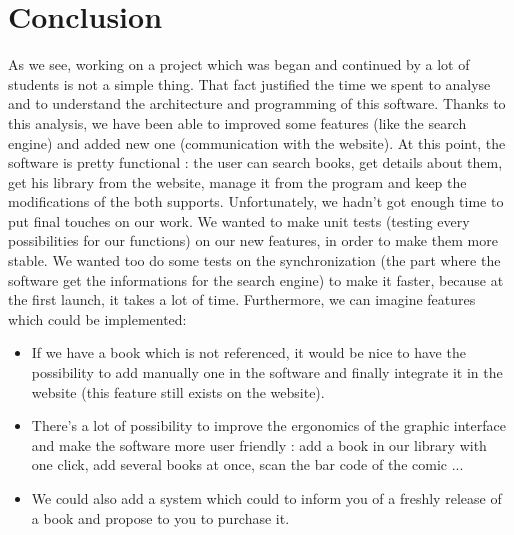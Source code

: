 \documentclass[11pt]{report} %
\begin{document}
\chapter{Conclusion}
As we see, working on a project which was began and continued by a lot of students is not a simple thing. That fact justified the time we spent to analyse and to understand the architecture and programming of this software. Thanks to this analysis, we have been able to improved some features (like the search engine) and added new one (communication with the website). 
\newline At this point, the software is pretty functional : the user can search books, get details about them, get his library from the website, manage it from the program and keep the modifications of the both supports.
\newline Unfortunately, we hadn't got enough time to put final touches on our work. We wanted to make unit tests (testing every possibilities for our functions) on our new features, in order to make them more stable. We wanted too do some tests on the synchronization (the part where the software get the informations for the search engine) to make it faster, because at the first launch, it takes a lot of time.
\newline Furthermore, we can imagine features which could be implemented:
\begin{itemize}
\item If we have a book which is not referenced, it would be nice to have the possibility to add manually one in the software and finally integrate it in the website (this feature still exists on the website).
\item There's a lot of possibility to improve the ergonomics of the graphic interface and make the software more user friendly : add a book in our library with one click, add several books at once, scan the bar code of the comic ...
\item We could also add a system which could to inform you of a freshly release of a book and propose to you to purchase it.
\end{itemize}


\begin{appendices}

\end{appendices}


\end{document}
